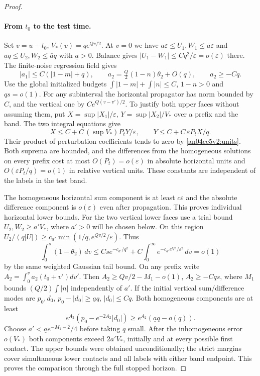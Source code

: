 \documentclass[11pt]{article}
\newcommand{\eps}{\varepsilon}
\begin{document}
\begin{proof}
\paragraph{From $t_0$ to the test time.}
Set $v=u-t_0$, $V_*(v)=q e^{Qv/2}$. At $v=0$ we have $\underline a\eps\le U_1,W_1\le\bar a\eps$ and $\underline a q\le U_2,W_2\le\bar a q$ with $\underline a>0$. Balance gives $|U_1-W_1|\le Cq^2/\eps=o(\eps)$ there. The finite-noise regression field gives
\[
 |a_1|\le C(|1-m|+q),\qquad
 a_2=\tfrac Q2(1-n)\theta_2+O(q),\qquad a_2\ge-Cq .
\]
Use the global initialized budgets $\int|1-m|+\int |n|\le C$, $1-n>0$ and $q s=o(1)$. For any subinterval the horizontal propagator has norm bounded by $C$, and the vertical one by $C e^{Q(v-v')/2}$. To justify both upper faces without assuming them, put $X=\sup |X_1|/\eps$, $Y=\sup |X_2|/V_*$ over a prefix and the band. The two integral equations give
\[
 X\le C+C\,(\sup V_*) P_t Y/\eps,\qquad
 Y\le C+C\,\eps P_t X/q .
\]
Their product of perturbation coefficients tends to zero by \eqref{an04ce5v2:units}. Both suprema are bounded, and the differences from the homogeneous solutions on every prefix cost at most $O(P_t)=o(\eps)$ in absolute horizontal units and $O(\eps P_t/q)=o(1)$ in relative vertical units. These constants are independent of the labels in the test band.

The homogeneous horizontal sum component is at least $c\eps$ and the absolute difference component is $o(\eps)$ even after propagation. This proves individual horizontal lower bounds. For the two vertical lower faces use a trial bound $U_2,W_2\ge a' V_*$, where $a'>0$ will be chosen below. On this region $U_2/(q|U|)\ge c_{a'}\min(1/q,e^{Qv/2}/\eps)$. Thus
\[
 \int_0^s(1-\theta_2)\,dv
 \le C s e^{-c_{a'}/q^2}
     +C\int_0^\infty e^{-c_{a'}e^{Qv}/\eps^2}\,dv=o(1)
\]
by the same weighted Gaussian tail bound. On any prefix write $A_2=\int_0^v a_2(t_0+v')dv'$. Then
$A_2\ge Qv/2-M_1-o(1)$, $A_2\ge-Cqs$, where $M_1$ bounds $(Q/2)\int|n|$ independently of $a'$. If the initial vertical sum/difference modes are $p_0,d_0$, $p_0-|d_0|\ge\underline a q$, $|d_0|\le Cq$. Both homogeneous components are at least
\[
 e^{A_2}(p_0-e^{-2A_2}|d_0|)
 \ge e^{A_2}(\underline a q-o(q)).
\]
Choose $a'<\underline a e^{-M_1-2}/4$ before taking $q$ small. After the inhomogeneous error $o(V_*)$ both components exceed $2a'V_*$, initially and at every possible first contact. The upper bounds were obtained unconditionally; the strict margins cover simultaneous lower contacts and all labels with either band endpoint. This proves the comparison through the full stopped horizon.


\end{proof}
\end{document}
